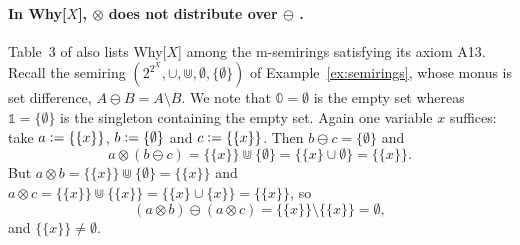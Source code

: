 \begin{toappendix}
  \paragraph*{In Why[$X$], $\otimes$ does not distribute over $\ominus$
  .}
  Table~3 of \cite{amsterdamer2011limitations} also lists Why[$X$] among
  the m-semirings satisfying its axiom A13.
  Recall the semiring $(2^{2^X},\cup,\Cup,\emptyset,\{\emptyset\})$ of
  Example~\ref{ex:semirings}, whose monus is set difference, $A\ominus
  B=A\setminus B$. We note that $\mathbb 0=\emptyset$ is the empty set whereas $\mathbb 1=\{\emptyset\}$ is the singleton containing
  the empty set. Again one variable $x$ suffices: take
  $a\mathrel{\mathop:}=\{\{x\}\}$, $b\mathrel{\mathop:}=\{\emptyset\}$ and $c\mathrel{\mathop:}=\{\{x\}\}$. Then
  $b\ominus c=\{\emptyset\}$ and
  \[
    a\otimes(b\ominus c)=\{\{x\}\}\Cup\{\emptyset\}=\{\{x\}\cup\emptyset\}
    =\{\{x\}\} .
  \]
  But $a\otimes b=\{\{x\}\}\Cup\{\emptyset\}=\{\{x\}\}$ and $a\otimes
  c=\{\{x\}\}\Cup\{\{x\}\}=\{\{x\}\cup\{x\}\}=\{\{x\}\}$, so
  \[
    (a\otimes b)\ominus(a\otimes c)=\{\{x\}\}\setminus\{\{x\}\}=\emptyset ,
  \]
and $\{\{x\}\}\neq\emptyset$.
\end{toappendix}

